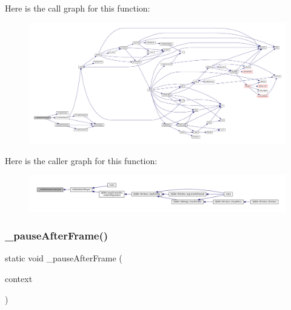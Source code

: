 Here is the call graph for this function\+:
\nopagebreak
\begin{figure}[H]
\begin{center}
\leavevmode
\includegraphics[width=350pt]{sdl-events_8c_af2e60a8e9c3fcba1e6310e13341ab656_cgraph}
\end{center}
\end{figure}
Here is the caller graph for this function\+:
\nopagebreak
\begin{figure}[H]
\begin{center}
\leavevmode
\includegraphics[width=350pt]{sdl-events_8c_af2e60a8e9c3fcba1e6310e13341ab656_icgraph}
\end{center}
\end{figure}
\mbox{\label{sdl-events_8c_a9975fd4e100657c0625df03e039dba9d}} 
\subsubsection{\texorpdfstring{\+\_\+pause\+After\+Frame()}{\_pauseAfterFrame()}}
{\footnotesize\ttfamily static void \+\_\+pause\+After\+Frame (\begin{DoxyParamCaption}\item[{struct m\+Core\+Thread $\ast$}]{context }\end{DoxyParamCaption})\hspace{0.3cm}{\ttfamily [static]}}

